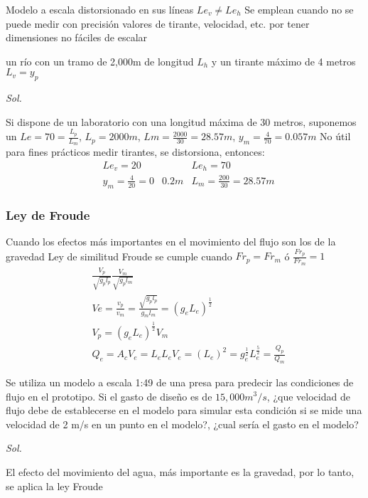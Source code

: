 Modelo a escala distorsionado en sus líneas
$Le_v \neq Le_h$
Se emplean cuando no se puede medir con precisión valores de tirante, velocidad, etc. por tener dimensiones
no fáciles de escalar

\begin{example}
    un río con un tramo de 2,000m de longitud $L_h$ y un tirante máximo de 4 metros $L_v=y_p$
\end{example}

\textit{ Sol. }

Si dispone de un laboratorio con una longitud máxima de 30 metros, suponemos un $Le = 70 = \frac{L_p}{L_m}$,
$L_p = 2000 m$, $Lm = \frac{2000}{30} = 28.57m$, $y_m = \frac{4}{70} = 0.057m$
No útil para fines prácticos medir tirantes, se distorsiona, entonces:
\begin{align*}
    &Le_v = 20&&Le_h = 70\\
    &y_m = \frac{4}{20}= 0& 0.2m&L_m = \frac{200}{30} = 28.57m
\end{align*}

\subsubsection{Ley de Froude}
Cuando los efectos más importantes en el movimiento del flujo son los de la gravedad
Ley de similitud Froude se cumple cuando $Fr_p=Fr_m$ ó $\frac{Fr_p}{Fr_m}=1$
\begin{align*}
    &\frac{V_p}{\sqrt{g_pl_p}} \frac{V_m}{\sqrt{g_pl_m}}\\ 
    &Ve = \frac{v_p}{v_m} =\frac{\sqrt{g_pl_p}}{g_ml_m} =\left(g_eL_e\right)^{\frac{1}{2}}\\ 
    &V_p =\left(g_eL_e\right)^{\frac{1}{2}}V_m\\
    &Q_e= A_cV_e = L_eL_eV_e =\left(L_e\right)^2 = g_e^{\frac{1}{2}}L_e^{\frac{5}{2}} = \frac{Q_p}{Q_m}
\end{align*}

\begin{example}
    Se utiliza un modelo a escala 1:49 de una presa para predecir las condiciones de flujo en el prototipo. Si el gasto de diseño es de $15,000 m^3/s$, ¿que velocidad de flujo debe de establecerse en el modelo para simular esta condición si se mide una velocidad de 2 m/s en un punto en el modelo?, ¿cual sería el gasto en el modelo?
\end{example}

\textit{ Sol. }

El efecto del movimiento del agua, más importante es la gravedad, por lo tanto, se aplica la ley Froude

